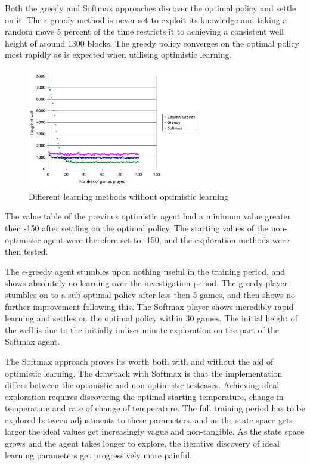 \documentclass{rucsthesis}
\begin{document}
Both the greedy and Softmax approaches discover the optimal policy and settle on it. The $\epsilon$-greedy method is never set to exploit its knowledge and taking a random move 5 percent of the time restricts it to achieving a consistent well height of around 1300 blocks. The greedy policy converges on the optimal policy most rapidly as is expected when utilising optimistic learning.

\begin{figure}[h]
\centering
\includegraphics[width=3in]{nonoptomisticexp.png}
\caption{Different learning methods without optimistic learning}
\label{fig:compexp}
\end{figure}

The value table of the previous optimistic agent had a minimum value greater then -150 after settling on the optimal policy. The starting values of the non-optimistic agent were therefore set to -150, and the exploration methods were then tested. 

The $\epsilon$-greedy agent stumbles upon nothing useful in the training period, and shows absolutely no learning over the investigation period. The greedy player stumbles on to a sub-optimal policy after less then 5 games, and then shows no further improvement following this. The Softmax player shows incredibly rapid learning and settles on the optimal policy within 30 games. The initial height of the well is due to the initially indiscriminate exploration on the part of the Softmax agent.

The Softmax approach proves its worth both with and without the aid of optimistic learning. The drawback with Softmax is that the implementation differs between the optimistic and non-optimistic testcases. Achieving ideal exploration requires discovering the optimal starting temperature, change in temperature and rate of change of temperature. The full training period has to be explored between adjustments to these parameters, and as the state space gets larger the ideal values get increasingly vague and non-tangible. As the state space grows and the agent takes longer to explore, the iterative discovery of ideal learning parameters get progressively more painful.
\end{document}
